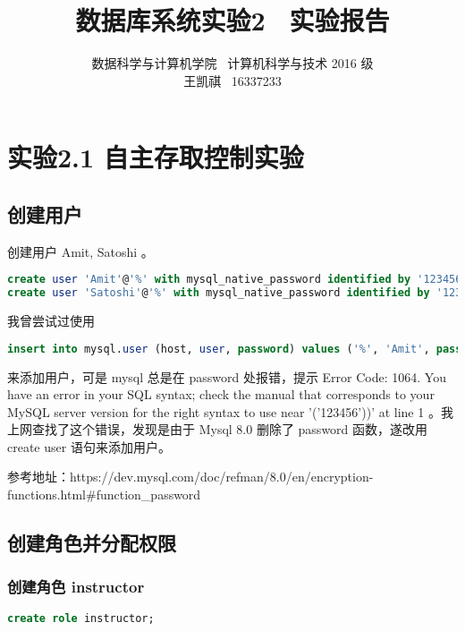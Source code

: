 \documentclass{article}
\begin{document}
\title{数据库系统实验2 \ 实验报告}
\author {数据科学与计算机学院 \ 计算机科学与技术 2016 级 \\ 王凯祺 \ 16337233}
\maketitle

\section{实验2.1 自主存取控制实验}

\subsection{创建用户}

创建用户 Amit, Satoshi 。

\begin{lstlisting}[language=sql]
create user 'Amit'@'%' with mysql_native_password identified by '123456';
create user 'Satoshi'@'%' with mysql_native_password identified by '123456';
\end{lstlisting}

我曾尝试过使用

\begin{lstlisting}[language=sql]
insert into mysql.user (host, user, password) values ('%', 'Amit', password('123456'));
\end{lstlisting}

来添加用户，可是 mysql 总是在 password 处报错，提示 Error Code: 1064. You have an error in your SQL syntax; check the manual that corresponds to your MySQL server version for the right syntax to use near '('123456'))' at line 1 。我上网查找了这个错误，发现是由于 Mysql 8.0 删除了 password 函数，遂改用 create user 语句来添加用户。

参考地址：https://dev.mysql.com/doc/refman/8.0/en/encryption-functions.html\#function\_password

\subsection{创建角色并分配权限}

\subsubsection{创建角色 instructor}

\begin{lstlisting}[language=sql]
create role instructor;
\end{lstlisting}
\end{document}
